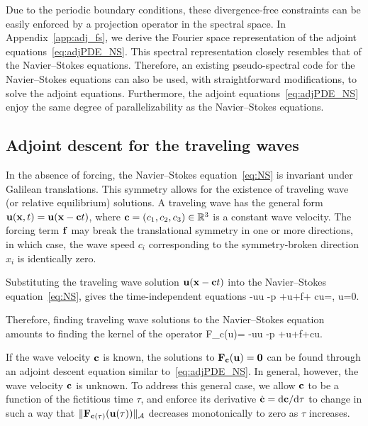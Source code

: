 \documentclass{jfm}
\begin{document}
Due to the periodic boundary conditions, these
divergence-free constraints can be easily enforced by a projection operator in the
spectral space.
In Appendix~\ref{app:adj_fs}, we derive the Fourier space
representation of the adjoint equations~\eqref{eq:adjPDE_NS}. This spectral representation
closely resembles that of the Navier--Stokes equations. Therefore, an existing pseudo-spectral code
for the Navier--Stokes equations can also be used, with straightforward modifications,
to solve the adjoint equations. Furthermore, the adjoint equations~\eqref{eq:adjPDE_NS}
enjoy the same degree of parallelizability as the Navier--Stokes equations.

\subsection{Adjoint descent for the traveling waves}\label{sec:tw}
In the absence of forcing, the Navier--Stokes equation~\eqref{eq:NS}
is invariant under Galilean translations. This symmetry allows
for the existence of traveling wave (or relative equilibrium) solutions. A traveling wave has the
general form $\mathbf u(\mathbf x,t)=\mathbf u(\mathbf x-\mathbf c t)$, where $\mathbf c=(c_1,c_2,c_3)\in\mathbb R^3$
is a constant wave velocity. The forcing term $\mathbf f$ may break the translational
symmetry in one or more directions, in which case, the wave
speed $c_i$ corresponding to the symmetry-broken
direction $x_i$ is identically zero.

Substituting the traveling wave solution $\mathbf u(\mathbf x-\mathbf c t)$ into the
Navier--Stokes equation~\eqref{eq:NS}, gives the time-independent equations
\beq
-\vc u\cdot\bnabla\vc u -\bnabla p +\nu\Delta\vc u+\vc f+
\vc c\cdot\bnabla \vc u=, \quad
\bnabla\cdot \vc u=0.
\eeq

Therefore, finding traveling wave solutions to the Navier--Stokes equation amounts to finding
the kernel of the operator
\beq
\vc F_{\vc c}(\vc u)=
-\vc u\cdot\bnabla\vc u -\bnabla p +\nu\Delta\vc u+\vc f+\vc c\cdot\bnabla \vc u.
\eeq

If the wave velocity $\mathbf c$ is known, the solutions to
$\mathbf F_{\mathbf c}(\mathbf u)=\mathbf 0$ can be found through
an adjoint descent equation similar to~\eqref{eq:adjPDE_NS}. In general, however, the wave
velocity $\mathbf c$ is unknown. To address this general case, we allow $\mathbf c$ to be
a function of the fictitious time $\tau$, and enforce its derivative
$\dot{\mathbf c}=\mathrm d\mathbf c/\mathrm d\tau$ to change in such a way that
$\|\mathbf F_{\mathbf c(\tau)}(\mathbf u(\tau))\|_{\mathcal A}$ decreases monotonically to zero
as $\tau$ increases.
\end{document}
